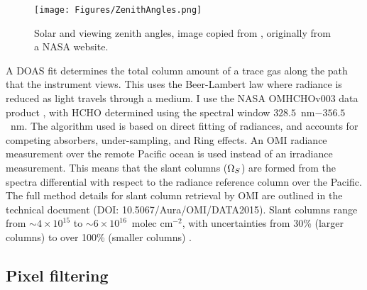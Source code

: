   
  \begin{figure}\begin{center}
      \texttt{[image: Figures/ZenithAngles.png]}
      \caption{Solar and viewing zenith angles, image copied from \textcite{SZA_Image}, originally from a NASA website.}
      \label{ch_HCHO:fig:zenithangle}
    \end{center}\end{figure}
  
  A DOAS fit determines the total column amount of a trace gas along the path that the instrument views.
  This uses the Beer-Lambert law where radiance is reduced as light travels through a medium.
  I use the NASA OMHCHOv003 data product \parencite{Abad2015}, with HCHO determined using the spectral window $328.5$~nm$ - 356.5$~nm. 
  The algorithm used is based on direct fitting of radiances, and accounts for competing absorbers, under-sampling, and Ring effects.
  An OMI radiance measurement over the remote Pacific ocean is used instead of an irradiance measurement.
  This means that the slant columns ($\Omega_{S}$) are formed from the spectra differential with respect to the radiance reference column over the Pacific.
  The full method details for slant column retrieval by OMI are outlined 
  in the technical document (DOI: 10.5067/Aura/OMI/DATA2015).
  Slant columns range from $\sim 4\times 10^{15} $ to $\sim 6 \times 10^{16}$~molec cm$^{-2}$, with uncertainties from 30\% (larger columns) to over 100\% (smaller columns) \parencite{Abad2015}.
  
  \subsection{Pixel filtering}
  \label{Model:omhcho:pixel_filtering}
  
